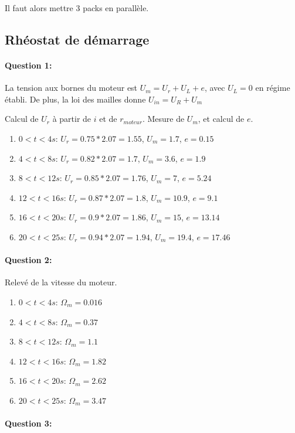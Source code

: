 Il faut alors mettre 3 packs en parallèle.

\subsection{Rhéostat de démarrage}

\paragraph{Question 1:}

La tension aux bornes du moteur est $U_m=U_r+U_L+e$, avec $U_L=0$ en régime établi. De plus, la loi des mailles donne $U_{in}=U_R+U_m$

Calcul de $U_r$ à partir de $i$ et de $r_{moteur}$. Mesure de $U_m$, et calcul de $e$.

\begin{enumerate}
 \item $0<t<4s$: $U_r=0.75*2.07=1.55$, $U_m=1.7$, $e=0.15$
 \item $4<t<8s$: $U_r=0.82*2.07=1.7$, $U_m=3.6$, $e=1.9$
 \item $8<t<12s$: $U_r=0.85*2.07=1.76$, $U_m=7$, $e=5.24$
 \item $12<t<16s$: $U_r=0.87*2.07=1.8$, $U_m=10.9$, $e=9.1$
 \item $16<t<20s$: $U_r=0.9*2.07=1.86$, $U_m=15$, $e=13.14$
 \item $20<t<25s$: $U_r=0.94*2.07=1.94$, $U_m=19.4$, $e=17.46$
\end{enumerate}

\paragraph{Question 2:}

Relevé de la vitesse du moteur.

\begin{enumerate}
 \item $0<t<4s$: $\Omega_m=0.016$
 \item $4<t<8s$: $\Omega_m=0.37$
 \item $8<t<12s$: $\Omega_m=1.1$
 \item $12<t<16s$: $\Omega_m=1.82$
 \item $16<t<20s$: $\Omega_m=2.62$
 \item $20<t<25s$: $\Omega_m=3.47$
\end{enumerate}

\paragraph{Question 3:}

